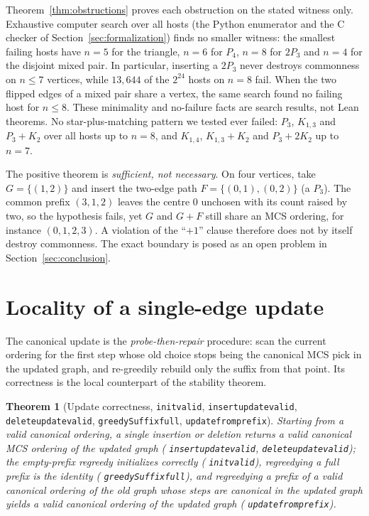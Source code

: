 \documentclass[11pt]{article}
\newtheorem{theorem}{Theorem}
\theoremstyle{definition}
\theoremstyle{remark}
\newcommand{\leanname}[1]{%
  \texttt{\begingroup\def\_{\textunderscore\allowbreak}#1\endgroup}}
\begin{document}
Theorem~\ref{thm:obstructions} proves each obstruction on the stated witness
only. Exhaustive computer search over all hosts (the Python enumerator and the
C checker of Section~\ref{sec:formalization}) finds no smaller witness: the
smallest failing hosts have $n=5$ for the triangle, $n=6$ for $P_4$, $n=8$ for
$2P_3$ and $n=4$ for the disjoint mixed pair. In particular, inserting a $2P_3$
never destroys commonness on $n\le 7$ vertices, while $13{,}644$ of the $2^{24}$
hosts on $n=8$ fail. When the two flipped edges of a mixed pair share a vertex,
the same search found no failing host for $n\le 8$. These minimality and
no-failure facts are search results, not Lean theorems. No star-plus-matching
pattern
we tested ever failed: $P_3$, $K_{1,3}$ and $P_3+K_2$ over all hosts up to
$n=8$, and $K_{1,4}$, $K_{1,3}+K_2$ and $P_3+2K_2$ up to $n=7$.

The positive theorem is \emph{sufficient, not necessary}. On four vertices, take
$G=\{(1,2)\}$ and insert the two-edge path $F=\{(0,1),(0,2)\}$ (a $P_3$). The
common prefix $(3,1,2)$ leaves the centre $0$ unchosen with its count raised by
two, so the hypothesis fails, yet $G$ and $G+F$ still share an MCS ordering,
for instance $(0,1,2,3)$. A violation of the ``$+1$'' clause therefore does not
by itself destroy commonness. The exact boundary is posed as an open problem in
Section~\ref{sec:conclusion}.

\section{Locality of a single-edge update}
\label{sec:locality}

The canonical update is the \emph{probe-then-repair} procedure: scan the current
ordering for the first step whose old choice stops being the canonical MCS pick
in the updated graph, and re-greedily rebuild only the suffix from that point. Its
correctness is the local counterpart of the stability theorem.

\begin{theorem}[Update correctness, \leanname{init\_valid}, \leanname{insert\_update\_valid}, \leanname{delete\_update\_valid}, \leanname{greedySuffix\_full}, \leanname{update\_from\_prefix}]
Starting from a valid canonical ordering, a single insertion or deletion returns
a valid canonical MCS ordering of the updated graph
(\leanname{insert\_update\_valid}, \leanname{delete\_update\_valid}); the
empty-prefix regreedy initializes correctly (\leanname{init\_valid}),
regreedying a full prefix is the identity (\leanname{greedySuffix\_full}), and
regreedying a prefix of a valid canonical ordering of the old graph whose steps
are canonical in the updated graph yields a valid canonical ordering of the
updated graph (\leanname{update\_from\_prefix}).
\end{theorem}
\end{document}
